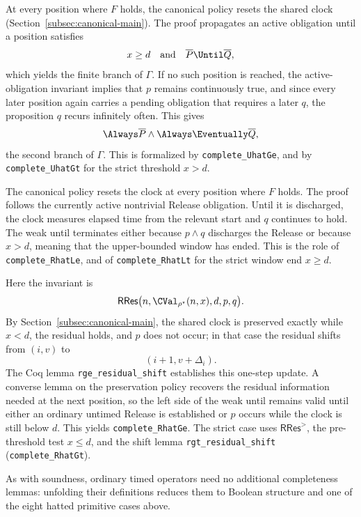 At every position where $F$ holds, the canonical policy resets the shared
clock (Section~\ref{subsec:canonical-main}).  The proof propagates an active obligation until a position satisfies
\[
  x\ge d
  \quad\text{and}\quad
  \overline{P}\Until \overline{Q},
\]
which yields the finite branch of $\Gamma$.  If no such position is reached,
the active-obligation invariant implies that $p$ remains continuously true,
and since every later position again carries a pending obligation that
requires a later $q$, the proposition $q$ recurs infinitely often.  This gives
\[
  \Always \overline{P}\land\Always\Eventually \overline{Q},
\]
the second branch of $\Gamma$.  This is formalized by
\texttt{complete\_\allowbreak{}UhatGe}, and by
\texttt{complete\_\allowbreak{}UhatGt} for the strict threshold $x>d$.

The canonical policy resets the clock at every position where $F$ holds.  The
proof follows the currently active nontrivial Release obligation.  Until it
is discharged, the clock measures elapsed time from the relevant start and
$q$ continues to hold.  The weak until terminates either because $p\land q$
discharges the Release or because $x>d$, meaning that the upper-bounded window
has ended.  This is the role of \texttt{complete\_\allowbreak{}RhatLe}, and of
\texttt{complete\_\allowbreak{}RhatLt} for the strict window end $x\ge d$.

Here the invariant is
\[
  \mathsf{RRes}
  \bigl(n,\CVal_{\rho^\star}(n,x),d,p,q\bigr).
\]
By Section~\ref{subsec:canonical-main}, the shared clock is preserved exactly
while $x<d$, the residual holds, and $p$ does not occur; in that case the
residual shifts
from $(i,v)$ to
\[
  (i+1,v+\Delta_i).
\]
The Coq lemma \texttt{rge\_\allowbreak{}residual\_\allowbreak{}shift} establishes this one-step update.
A converse lemma on the preservation policy recovers the residual information needed
at the next position, so the left side of the weak until remains valid until
either an ordinary untimed Release is established or $p$ occurs while the
clock is still below $d$.  This yields \texttt{complete\_\allowbreak{}RhatGe}.
The strict case uses $\mathsf{RRes}^{>}$, the pre-threshold test $x\le d$, and
the shift lemma \texttt{rgt\_\allowbreak{}residual\_\allowbreak{}shift}
(\texttt{complete\_\allowbreak{}RhatGt}).

As with soundness, ordinary timed operators need no additional completeness
lemmas: unfolding their definitions reduces them to Boolean structure and one
of the eight hatted primitive cases above.
